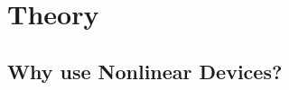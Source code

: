 \documentclass[journal]{IEEEtran}
\begin{document}






%



\section{ Theory }
\subsection{Why use Nonlinear Devices?}
\end{document}
